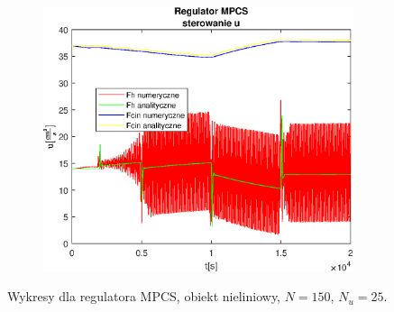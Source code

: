\begin{figure}[h!]
   \begin{subfigure}[b]{0.4\textwidth}
      \includegraphics[width=1\linewidth]{img/MPCSnumRK/MPCSRKControlN150Nu25l60.eps}
      \caption{}
      \label{fig:fig:MPCSRKN150Nu25l603}
   \end{subfigure}
       
   \caption{Wykresy dla regulatora MPCS, obiekt nieliniowy, $N = 150$, $N_u = 25$.}
   \label{fig:MPCSRKN150Nu25l60}
\end{figure}
           
